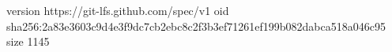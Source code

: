 version https://git-lfs.github.com/spec/v1
oid sha256:2a83e3603c9d4e3f9dc7cb2ebc8c2f3b3ef71261ef199b082dabca518a046c95
size 1145
